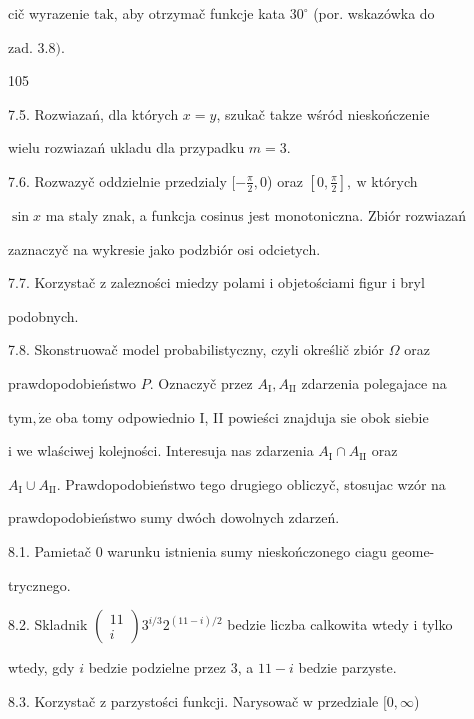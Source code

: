 \documentclass[a4paper,12pt]{article}
\begin{document}
cič wyrazenie $\mathrm{t}\mathrm{a}\mathrm{k}$, aby otrzymač funkcje kata $30^{\circ}$ (por. wskazówka do

$\mathrm{z}\mathrm{a}\mathrm{d}$. 3.8$).$





105

7.5. Rozwiazań, dla których $x=y$, szukač takze wśród nieskończenie

wielu rozwiazań ukladu dla przypadku $m=3.$

7.6. Rozwazyč oddzielnie przedzialy $[-\displaystyle \frac{\pi}{2},0$) oraz $[0,\displaystyle \frac{\pi}{2}],\ \mathrm{w}$ których

$\sin x$ ma staly znak, a funkcja cosinus jest monotoniczna. Zbiór rozwiazań

zaznaczyč na wykresie jako podzbiór osi odcietych.

7.7. Korzystač $\mathrm{z}$ zalezności miedzy polami $\mathrm{i}$ objetościami figur $\mathrm{i}$ bryl

podobnych.

7.8. Skonstruowač model probabilistyczny, czyli określič zbiór $\Omega$ oraz

prawdopodobieństwo $P$. Oznaczyč przez $A_{\mathrm{I}}, A_{\mathrm{I}\mathrm{I}}$ zdarzenia polegajace na

$\mathrm{t}\mathrm{y}\mathrm{m}, \dot{\mathrm{z}}\mathrm{e}$ oba tomy odpowiednio I, II powieści znajduja $\mathrm{s}\mathrm{i}\mathrm{e}$ obok siebie

$\mathrm{i}$ we wlaściwej kolejności. Interesuja nas zdarzenia $A_{\mathrm{I}} \cap A_{\mathrm{I}\mathrm{I}}$ oraz

$A_{\mathrm{I}}\cup A_{\mathrm{I}\mathrm{I}}$. Prawdopodobieństwo tego drugiego obliczyč, stosujac wzór na

prawdopodobieństwo sumy dwóch dowolnych zdarzeń.

8.1. Pamietač $0$ warunku istnienia sumy nieskończonego ciagu geome-

trycznego.

8.2. Skladnik $\left(\begin{array}{l}
11\\
i
\end{array}\right)3^{i/3}2^{(11-i)/2}$ bedzie liczba calkowita wtedy $\mathrm{i}$ tylko

wtedy, gdy $i$ bedzie podzielne przez 3, a $11-i$ bedzie parzyste.

8.3. Korzystač $\mathrm{z}$ parzystości funkcji. Narysowač $\mathrm{w}$ przedziale $[0,\infty$)
\end{document}
